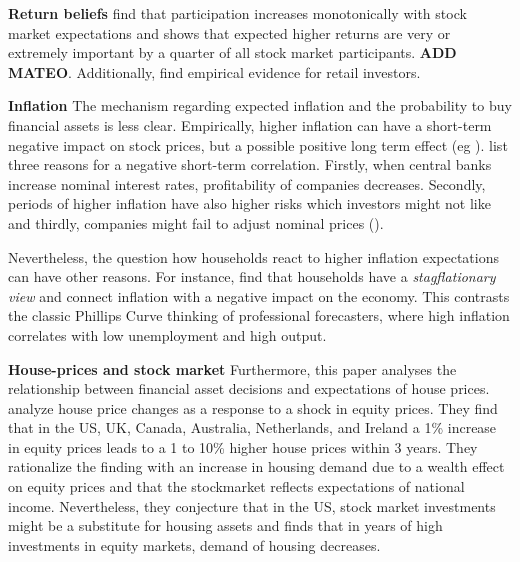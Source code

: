 \documentclass[ProjectABM]{subfiles}
\begin{document}
\textbf{Return beliefs}
\cite{arrondel_et_al_2014subjective_return_expectation} find that participation increases monotonically with stock market expectations and \cite{choi_2020} shows that expected higher returns are very or extremely important by a quarter of all stock market participants. \textbf{ADD MATEO}.  Additionally, \cite{giglio_et_al_2019five} find empirical evidence for retail investors.

\textbf{Inflation}
The mechanism regarding expected inflation and the probability to buy financial assets is less clear. Empirically, higher inflation can have a short-term negative impact on stock prices, but a possible positive long term effect (eg \cite{anari_kolari_2001inflation}). \cite{campbell_vuolteenaho_2004inflation} list three reasons for a negative short-term correlation. Firstly, when central banks increase nominal interest rates, profitability of companies decreases. Secondly, periods of higher inflation have also higher risks which investors might not like and thirdly, companies might fail to adjust nominal prices (\cite{modigliani_cohn1979inflation}).

Nevertheless, the question how households react to higher inflation expectations can have other reasons. For instance, \cite{CCG_2020_inflation_communication} find that households have a \textit{stagflationary view} and connect inflation with a negative impact on the economy. This contrasts the classic Phillips Curve thinking of professional forecasters, where high inflation correlates with low unemployment and high output. %


\textbf{House-prices and stock market}
Furthermore, this paper analyses the relationship between financial asset decisions and expectations of house prices. \cite{sutton2002houseprices} analyze house price changes as a response to a shock in equity prices. They find that in the US, UK, Canada, Australia, Netherlands, and Ireland a 1\% increase in equity prices leads to a 1 to 10\% higher house prices within 3 years. They rationalize the finding with an increase in housing demand due to a wealth effect on equity prices and that the stockmarket reflects expectations of national income. Nevertheless, they conjecture that in the US, stock market investments might be a substitute for housing assets and finds that in years of high investments in equity markets, demand of housing decreases. %
\end{document}
